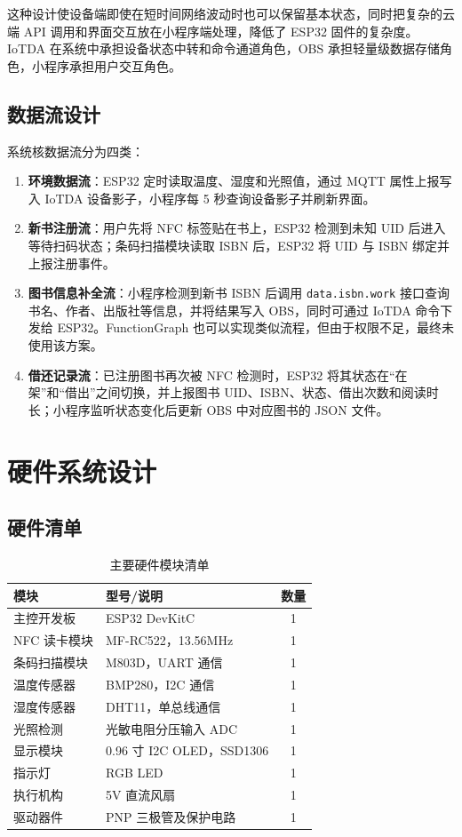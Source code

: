 \documentclass[12pt,hyperref,a4paper,UTF8]{ctexart}
\begin{document}
这种设计使设备端即使在短时间网络波动时也可以保留基本状态，同时把复杂的云端 API 调用和界面交互放在小程序端处理，降低了 ESP32 固件的复杂度。IoTDA 在系统中承担设备状态中转和命令通道角色，OBS 承担轻量级数据存储角色，小程序承担用户交互角色。

\subsection{数据流设计}

系统核数据流分为四类：

\begin{enumerate}
    \item \textbf{环境数据流}：ESP32 定时读取温度、湿度和光照值，通过 MQTT 属性上报写入 IoTDA 设备影子，小程序每 5 秒查询设备影子并刷新界面。
    \item \textbf{新书注册流}：用户先将 NFC 标签贴在书上，ESP32 检测到未知 UID 后进入等待扫码状态；条码扫描模块读取 ISBN 后，ESP32 将 UID 与 ISBN 绑定并上报注册事件。
    \item \textbf{图书信息补全流}：小程序检测到新书 ISBN 后调用 \texttt{data.isbn.work} 接口查询书名、作者、出版社等信息，并将结果写入 OBS，同时可通过 IoTDA 命令下发给 ESP32。FunctionGraph 也可以实现类似流程，但由于权限不足，最终未使用该方案。
    \item \textbf{借还记录流}：已注册图书再次被 NFC 检测时，ESP32 将其状态在“在架”和“借出”之间切换，并上报图书 UID、ISBN、状态、借出次数和阅读时长；小程序监听状态变化后更新 OBS 中对应图书的 JSON 文件。
\end{enumerate}
\clearpage

\section{硬件系统设计}

\subsection{硬件清单}

\begin{table}[!htbp]
    \centering
    \begin{tabular}{l|l|c}
    \hline
        模块 & 型号/说明 & 数量 \\
    \hline
        主控开发板 & ESP32 DevKitC & 1 \\
        NFC 读卡模块 & MF-RC522，13.56MHz & 1 \\
        条码扫描模块 & M803D，UART 通信 & 1 \\
        温度传感器 & BMP280，I2C 通信 & 1 \\
        湿度传感器 & DHT11，单总线通信 & 1 \\
        光照检测 & 光敏电阻分压输入 ADC & 1 \\
        显示模块 & 0.96 寸 I2C OLED，SSD1306 & 1 \\
        指示灯 & RGB LED & 1 \\
        执行机构 & 5V 直流风扇 & 1 \\
        驱动器件 & PNP 三极管及保护电路 & 1 \\
    \hline
    \end{tabular}
    \caption{主要硬件模块清单}
    \label{tab:hardware}
\end{table}
\end{document}
